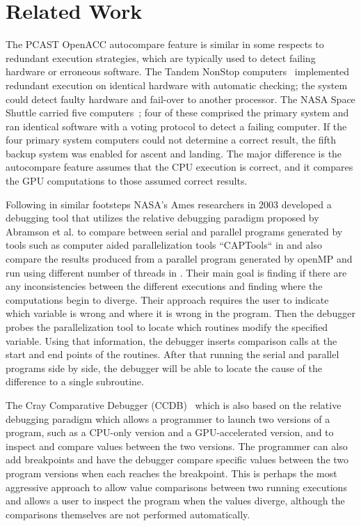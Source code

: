 \section{Related Work}


The PCAST OpenACC autocompare feature is similar in some respects to redundant execution strategies, which are typically used to detect failing hardware or erroneous software.
The Tandem NonStop computers~\cite{bartlett.tandem.86} implemented redundant execution on identical hardware with automatic checking; the system could detect faulty hardware and fail-over to another processor.
The NASA Space Shuttle carried five computers~\cite{fraser.astro.74}; four of these comprised the primary system and ran identical software with a voting protocol to detect a failing computer.
If the four primary system computers could not determine a correct result, the fifth backup system was enabled for ascent and landing.
The major difference is the autocompare feature assumes that the CPU execution is correct, and it compares the GPU computations to those assumed correct results.

Following in similar footsteps NASA’s Ames researchers in 2003 developed a debugging tool that utilizes the relative debugging paradigm proposed by Abramson et al. \cite{abramson1994relative}\cite{abramson1996relative} to compare between serial and parallel programs generated by tools such as computer aided parallelization tools “CAPTools“ in \cite{jost2003relative} and also compare the results produced from a parallel program generated by openMP and run using different number of threads in \cite{matthews2003automatic}. Their main goal is finding if there are any inconsistencies between the different executions and finding where the computations begin to diverge. Their approach requires the user to indicate which variable is wrong and where it is wrong in the program. Then the debugger probes the parallelization tool to locate which routines modify the specified variable. Using that information, the debugger inserts comparison calls at the start and end points of the routines. After that running the serial and parallel programs side by side, the debugger will be able to locate the cause of the difference to a single subroutine. 

The Cray Comparative Debugger (CCDB)~\cite{derose.sc.15} which is also based on the relative debugging paradigm which allows a programmer to launch two versions of a program, such as a CPU-only version and a GPU-accelerated version, and to inspect and compare values between the two versions.
The programmer can also add breakpoints and have the debugger compare specific values between the two program versions when each reaches the breakpoint.
This is perhaps the most aggressive approach to allow value comparisons between two running executions and allows a user to inspect the program when the values diverge, although the comparisons themselves are not performed automatically.

